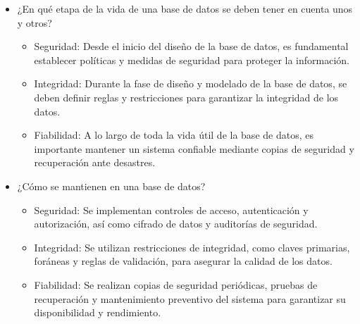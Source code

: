 \begin{enumerate}
\begin{itemize}
            \item ¿En qué etapa de la vida de una base de datos se deben tener en cuenta unos y otros?
            
            \begin{itemize}
                \item Seguridad: Desde el inicio del diseño de la base de datos, es fundamental establecer políticas y medidas de seguridad para proteger la información.
                \item Integridad: Durante la fase de diseño y modelado de la base de datos, se deben definir reglas y restricciones para garantizar la integridad de los datos.
                \item Fiabilidad: A lo largo de toda la vida útil de la base de datos, es importante mantener un sistema confiable mediante copias de seguridad y recuperación ante desastres.
            \end{itemize}

            \item ¿Cómo se mantienen en una base de datos? 
            \begin{itemize}
                \item Seguridad: Se implementan controles de acceso, autenticación y autorización, así como cifrado de datos y auditorías de seguridad.
                \item Integridad: Se utilizan restricciones de integridad, como claves primarias, foráneas y reglas de validación, para asegurar la calidad de los datos.
                \item Fiabilidad: Se realizan copias de seguridad periódicas, pruebas de recuperación y mantenimiento preventivo del sistema para garantizar su disponibilidad y rendimiento.
            \end{itemize}
        \end{itemize}
\end{enumerate}
